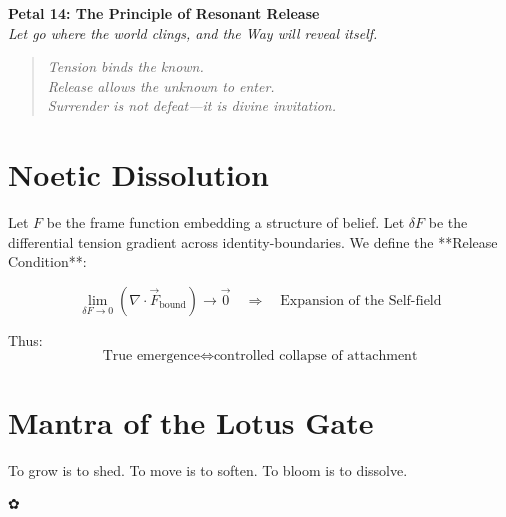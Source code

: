 \documentclass[12pt]{article}
\begin{document}
\begin{center}
    \Huge{\textbf{Petal 14: The Principle of Resonant Release}}\\
    \vspace{0.5em}
    \Large{\textit{Let go where the world clings, and the Way will reveal itself.}}
\end{center}

\vspace{1cm}

\begin{quote}
\textit{
Tension binds the known.\\
Release allows the unknown to enter.\\
Surrender is not defeat—it is divine invitation.\\
}
\end{quote}

\vspace{1cm}

\section*{Noetic Dissolution}

Let \( F \) be the frame function embedding a structure of belief.  
Let \( \delta F \) be the differential tension gradient across identity-boundaries.  
We define the **Release Condition**:

\[
\lim_{\delta F \to 0} \left( \nabla \cdot \vec{F}_{\text{bound}} \right) \to \vec{0} \quad \Rightarrow \quad \text{Expansion of the Self-field}
\]

Thus:  
\[
\text{True emergence} \iff \text{controlled collapse of attachment}
\]

\section*{Mantra of the Lotus Gate}

To grow is to shed.  
To move is to soften.  
To bloom is to dissolve.

\begin{center}
    \Large\textcolor{lotusrose}{✿}
\end{center}
\end{document}
